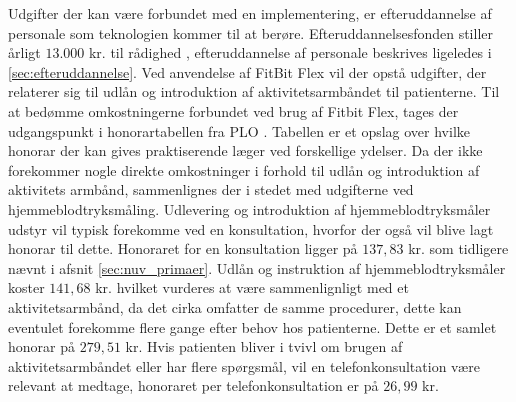 Udgifter der kan være forbundet med en implementering, er efteruddannelse af personale som teknologien kommer til at berøre. Efteruddannelsesfonden stiller årligt $13.000$ kr. til rådighed \citep{vedsted2005}, efteruddannelse af personale beskrives ligeledes i \autoref{sec:efteruddannelse}.   
Ved anvendelse af FitBit Flex vil der opstå udgifter, der relaterer sig til udlån og introduktion af aktivitetsarmbåndet til patienterne. Til at bedømme omkostningerne forbundet ved brug af Fitbit Flex, tages der udgangspunkt i honorartabellen fra PLO \citep{honorartabel2016}. Tabellen er et opslag over hvilke honorar der kan gives praktiserende læger ved forskellige ydelser.
Da der ikke forekommer nogle direkte omkostninger i forhold til udlån og introduktion af aktivitets armbånd, sammenlignes der i stedet med udgifterne ved hjemmeblodtryksmåling. Udlevering og introduktion af hjemmeblodtryksmåler udstyr vil typisk forekomme ved en konsultation, hvorfor der også vil blive lagt honorar til dette. Honoraret for en konsultation ligger på $137,83$ kr. som tidligere nævnt i afsnit \autoref{sec:nuv_primaer}. Udlån og instruktion af hjemmeblodtryksmåler koster $141,68$ kr. hvilket vurderes at være sammenlignligt med et aktivitetsarmbånd, da det cirka omfatter de samme procedurer, dette kan eventulet forekomme flere gange efter behov hos patienterne. Dette er et samlet honorar på $279,51$ kr. Hvis patienten bliver i tvivl om brugen af aktivitetsarmbåndet eller har flere spørgsmål, vil en telefonkonsultation være relevant at medtage, honoraret per telefonkonsultation er på $26,99$ kr.

